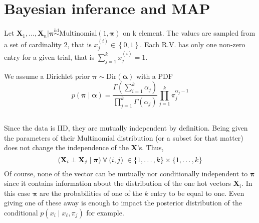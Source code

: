 \documentclass{article}
\newcommand{\s}{\hspace{0.1cm}}
\numberwithin{equation}{section}
\begin{document}
\section{Bayesian inferance and MAP}
Let $\mathbf{X}_1, \dots , \mathbf{X}_n \bm{\mid} \bm{\pi} \overset{\text{iid} }{\sim} 
\text{Multinomial} (1, \bm{ \pi} )$ on k element. The values are sampled from a set of cardinality 
2, that is $x^{(i)}_j \in \left\{ 0, 1 \right\}$. Each R.V. has only one non-zero 
entry for a given trial, that is $\sum_{j = 1}^k x^{(i)}_j = 1$. \par
We assume a Dirichlet prior $\bm{ \pi} \sim \text{Dir} ( \bm{ \alpha} )$ with 
a PDF
\[
        p(\bm{ \pi}  \mid \bm{ \alpha} ) = \frac{\Gamma ( \sum _{i = 1}^k \alpha_j) }{
        \prod_{j=1}^k \Gamma(\alpha_j)} \prod_{j = 1}^k \pi_j^{\alpha_j - 1}
\]

\subsection{}
Since the data is IID, they are mutually independent by definition. Being given the 
parameters of their Multinomial distribution (or a subset for that matter) 
does not change the independence of the $\mathbf{X}$'s. Thus, 
\[
        (\mathbf{X}_i \perp \mathbf{X}_j \mid \bm{ \pi}) \s \forall \s (i,j) \s \in 
        \left\{ 1,\dots ,k \right\} \times \left\{ 1,\dots ,k \right\}
\]
Of course, none of the vector can be mutually nor conditionally independent to $\bm{ \pi} $ 
since it contains information about the distribution of the one hot vectors $\mathbf{X}_i$. 
In this case $\bm{ \pi} $ are the probabilities of one of the $k$ entry to be equal 
to one. Even giving one of these away is enough to impact the posterior distribution 
of the conditional $p(x_i\mid x_\ell, \pi_j )$ for example.
\end{document}
